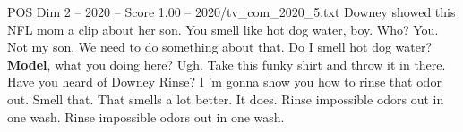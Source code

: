 \begin{textsample}{POS Dim 2 – 2020 – Score 1.00 – 2020/tv\_com\_2020\_5.txt}  \label{ex:f2_pos_075}
Downey showed this NFL mom a clip about her son.
You smell like hot dog water, boy.
Who?
You.
Not my son.
We need to do something about that.
Do I smell hot dog water? \textbf{Model}, what you doing here?
Ugh.
Take this funky shirt and throw it in there.
Have you heard of Downey Rinse?
I 'm gonna show you how to rinse that odor out.
Smell that.
That smells a lot better.
It does.
Rinse impossible odors out in one wash.
Rinse impossible odors out in one wash.

\end{textsample}
